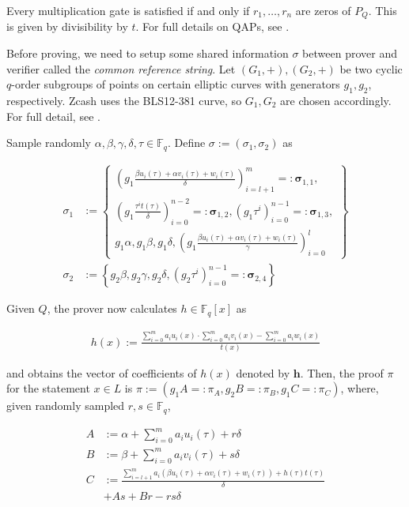 \documentclass{article}
\begin{document}
Every multiplication gate is satisfied if and only if $r_1,\ldots,r_n$ are zeros of $P_Q$.
This is given by divisibility by $t$.
For full details on QAPs, see \cite{gennaro:qap}.

Before proving, we need to setup some shared information $\sigma$ between prover and verifier called the \textit{common reference string}.
Let $(G_1, +), (G_2, +)$ be two cyclic $q$-order subgroups of points on certain elliptic curves with generators $g_1, g_2$, respectively.
Zcash uses the BLS12-381\cite{barreto:bls} curve, so $G_1,G_2$ are chosen accordingly.
For full detail, see \cite{hopwood:zcash}.

Sample randomly $\alpha, \beta, \gamma, \delta, \tau \in \mathbb{F}_q$. Define $\sigma := (\sigma_1, \sigma_2)$ as

\begin{adjustbox}{max width=.5\textwidth}
\parbox{\linewidth}{
\begin{align*}
        \sigma_1 &:= \left\{\begin{aligned}\left(g_1\frac{\beta u_i(\tau) + \alpha v_i(\tau) + w_i(\tau)}{\delta}\right)_{i=l+1}^m =: \boldsymbol\sigma_{1,1},\\
        \left(g_1\frac{\tau^i t(\tau)}{\delta}\right)_{i=0}^{n-2} =: \boldsymbol\sigma_{1,2}, \left(g_1{\tau^i}\right)_{i=0}^{n-1} =: \boldsymbol\sigma_{1,3},\\
        g_1\alpha, g_1\beta, g_1\delta, \left(g_1\frac{\beta u_i(\tau) + \alpha v_i(\tau) + w_i(\tau)}{\gamma}\right)_{i=0}^l\end{aligned}\right\} \\
        \sigma_2 &:= \left\{g_2\beta, g_2\gamma, g_2\delta, (g_2{\tau^i})_{i=0}^{n-1} =: \boldsymbol\sigma_{2,4}\right\}
\end{align*}}
\end{adjustbox}

Given $Q$, the prover now calculates $h \in \mathbb{F}_q[x]$ as

\begin{align}h(x) := \frac{\sum_{i=0}^m a_iu_i(x) \cdot \sum_{i=0}^m a_iv_i(x) - \sum_{i=0}^{m} a_iw_i(x)}{t(x)} \label{eq:h}\end{align}

and obtains the vector of coefficients of $h(x)$ denoted by $\boldsymbol{h}$.
Then, the proof $\pi$ for the statement $x \in L$ is $\pi := (g_1A =: \pi_A, g_2B =: \pi_B, g_1C =: \pi_C)$, where, given randomly sampled $r,s\in \mathbb{F}_q$,

\begin{align}
        A &:= \alpha + \sum_{i=0}^m a_iu_i(\tau) + r\delta \label{eq:A} \\
        B &:= \beta + \sum_{i=0}^m a_iv_i(\tau) + s\delta \label{eq:B} \\
        C &:= \frac{\sum_{i=l+1}^m a_i(\beta u_i(\tau) + \alpha v_i(\tau) + w_i(\tau)) + h(\tau)t(\tau)}{\delta} \label{eq:C} \\
        & + As + Br - rs\delta \nonumber
\end{align}
\end{document}
